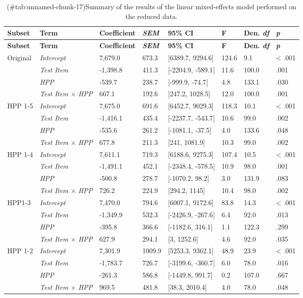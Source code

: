 \begin{appendix}
\begin{longtable}[]{@{}llllllll@{}}
\caption{(\#tab:unnamed-chunk-17)Summary of the results of the linear
mixed-effects model performed on the reduced data.}\tabularnewline
\toprule
\textbf{Subset} & \textbf{Term} & \textbf{Coefficient} &
\textbf{\emph{SEM}} & \textbf{95\% CI} & \textbf{F} & \textbf{Den.
\emph{df}} & \textbf{\emph{p}}\tabularnewline
\midrule
\endfirsthead
\toprule
\textbf{Subset} & \textbf{Term} & \textbf{Coefficient} &
\textbf{\emph{SEM}} & \textbf{95\% CI} & \textbf{F} & \textbf{Den.
\emph{df}} & \textbf{\emph{p}}\tabularnewline
\midrule
\endhead
Original & \emph{Intercept} & 7,679.0 & 673.3 & {[}6389.7, 9294.6{]} &
124.6 & 9.1 & \textless{} .001\tabularnewline
& \emph{Test Item} & -1,398.8 & 411.3 & {[}-2204.9, -589.1{]} & 11.6 &
100.0 & .001\tabularnewline
& \emph{HPP} & -539.7 & 238.7 & {[}-999.9, -74.7{]} & 4.8 & 133.1 &
.030\tabularnewline
& \emph{Test Item \(\times\) HPP} & 667.1 & 192.6 & {[}247.2, 1028.5{]}
& 12.0 & 100.0 & .001\tabularnewline
HPP 1-5 & \emph{Intercept} & 7,675.0 & 691.6 & {[}6452.7, 9029.3{]} &
118.3 & 10.1 & \textless{} .001\tabularnewline
& \emph{Test Item} & -1,416.1 & 435.4 & {[}-2237.7, -543.7{]} & 10.6 &
99.0 & .002\tabularnewline
& \emph{HPP} & -535.6 & 261.2 & {[}-1081.1, -37.5{]} & 4.0 & 133.6 &
.048\tabularnewline
& \emph{Test Item \(\times\) HPP} & 677.8 & 211.3 & {[}241, 1081.9{]} &
10.3 & 99.0 & .002\tabularnewline
HPP 1-4 & \emph{Intercept} & 7,611.1 & 719.3 & {[}6188.6, 9275.3{]} &
107.4 & 10.5 & \textless{} .001\tabularnewline
& \emph{Test Item} & -1,491.1 & 452.1 & {[}-2348.4, -578.5{]} & 10.9 &
98.0 & .001\tabularnewline
& \emph{HPP} & -500.8 & 278.7 & {[}-1070.2, 98.2{]} & 3.0 & 131.9 &
.083\tabularnewline
& \emph{Test Item \(\times\) HPP} & 726.2 & 224.9 & {[}294.2, 1145{]} &
10.4 & 98.0 & .002\tabularnewline
HPP1-3 & \emph{Intercept} & 7,470.0 & 794.6 & {[}6007.1, 9172.6{]} &
83.8 & 14.3 & \textless{} .001\tabularnewline
& \emph{Test Item} & -1,349.9 & 532.3 & {[}-2426.9, -267.6{]} & 6.4 &
92.0 & .013\tabularnewline
& \emph{HPP} & -395.8 & 366.6 & {[}-1182.6, 316.1{]} & 1.1 & 122.3 &
.299\tabularnewline
& \emph{Test Item \(\times\) HPP} & 627.9 & 294.1 & {[}3, 1252.6{]} &
4.6 & 92.0 & .035\tabularnewline
HPP 1-2 & \emph{Intercept} & 7,301.9 & 1009.9 & {[}5253.3, 9362.1{]} &
48.9 & 23.9 & \textless{} .001\tabularnewline
& \emph{Test Item} & -1,783.7 & 726.7 & {[}-3199.6, -360.7{]} & 6.0 &
78.0 & .016\tabularnewline
& \emph{HPP} & -261.3 & 586.8 & {[}-1449.8, 991.7{]} & 0.2 & 107.0 &
.667\tabularnewline
& \emph{Test Item \(\times\) HPP} & 969.5 & 481.8 & {[}38.3, 2010.4{]} &
4.0 & 78.0 & .048\tabularnewline
\bottomrule
\end{longtable}


\end{appendix}
